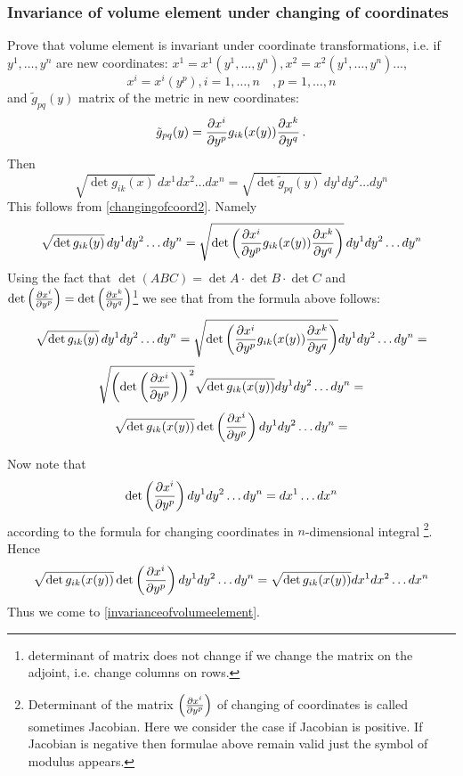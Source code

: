 \documentclass[12pt]{article}
\theoremstyle{theorem}
\numberwithin{equation}{section}
\begin{document}
{\small      \medskip
\subsubsection{ Invariance of volume element under changing of coordinates}
\medskip

    Prove that volume element is invariant under coordinate transformations,
    i.e. if $y^1,\dots,y^n$ are new coordinates:
    $x^1=x^1(y^1,\dots,y^n), x^2=x^2(y^1,\dots,y^n)...$,
                      $$
          x^i=x^i(y^p), i=1,\dots,n\quad, p=1,\dots,n
                      $$
and   $\tilde g_{pq}(y)$ matrix of the metric in new coordinates:
                       \begin{equation}\label{changingofcoord2}
    \tilde g_{pq}(y)={\partial x^i\over \partial y^{p}}g_{ik}(x(y))
             {\partial x^k\over \partial y^{q}}\,.
\end{equation}
Then
                    \begin{equation}\label{invarianceofvolumeelement}
 \sqrt {\det g_{ik}(x)}\,dx^1 dx^2 \dots dx^n=
 \sqrt {\det \tilde g_{pq}(y)}\,dy^1 dy^2 \dots dy^n
\end{equation}
This follows from \eqref{changingofcoord2}. Namely
                             $$
\sqrt {\det g_{ik}(y)}\,dy^1 dy^2 \dots dy^n=
\sqrt {\det \left({\partial x^i\over \partial y^{p}}g_{ik}(x(y))
             {\partial x^k\over \partial y^{q}}\right)}\,dy^1 dy^2 \dots dy^n
                             $$
Using the fact that $\det (ABC)=\det A\cdot \det B\cdot \det C$
and  $\det \left({\partial x^i\over \partial y^{p}}\right)=
\det \left({\partial x^k\over \partial y^{q}}\right)$\footnote{determinant of matrix does not change
if we change the matrix on the adjoint, i.e. change columns on rows.} we see that
from the formula above follows:
           $$
           \sqrt {\det g_{ik}(y)}\,dy^1 dy^2 \dots dy^n=
\sqrt {\det \left({\partial x^i\over \partial y^{p}}g_{ik}(x(y))
             {\partial x^k\over \partial y^{q}}\right)}
          dy^1 dy^2 \dots dy^n=
           $$
           $$
\sqrt {\left(\det
        \left(
    {\partial x^i\over \partial y^{p}}
    \right)\right)^2}
     \sqrt {\det g_{ik}(x(y))}
     dy^1 dy^2 \dots dy^n=
           $$
\begin{equation}\label{transformofvolumeform4}
\sqrt {\det g_{ik}(x(y))}
         \det
        \left(
    {\partial x^i\over \partial y^{p}}
    \right)
    dy^1 dy^2 \dots dy^n=
\end{equation}


Now note that   $$
\det \left({\partial x^i\over \partial y^{p}}\right)dy^1 dy^2 \dots dy^n=dx^1\dots dx^n
                $$
according to the formula for changing coordinates in $n$-dimensional integral
\footnote{Determinant of the matrix $\left({\partial x^i\over \partial y^{p}}\right)$ of changing of coordinates
is called sometimes Jacobian. Here we consider the case if Jacobian is positive.
If Jacobian is negative then formulae above remain valid just the symbol of modulus appears.}.
Hence
\begin{equation}\label{transformofvolumeform5}
\sqrt {\det g_{ik}(x(y))}\det
      \left(
 {\partial x^i\over \partial y^{p}}
 \right) dy^1 dy^2 \dots dy^n=
\sqrt {\det g_{ik}(x(y))}dx^1 dx^2 \dots dx^n
\end{equation}
Thus we come to \eqref{invarianceofvolumeelement}.}
\end{document}
